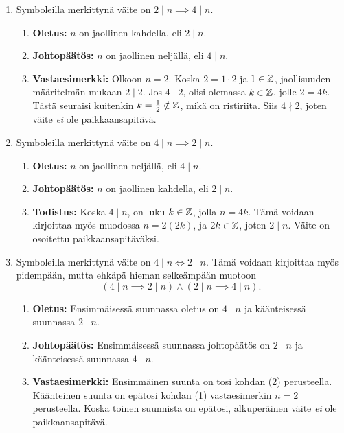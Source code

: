 \documentclass[11pt,a4paper]{amsart}
\begin{document}
\begin{solution}
  \leavevmode\par
  \begin{enumerate}[label=(\arabic*), nosep]
    \item Symboleilla merkittynä väite on \(2 \mid n \implies 4 \mid n\).
    \begin{enumerate}[label=\alph*), nosep]
      \item \textbf{Oletus:} \(n\) on jaollinen kahdella, eli \(2 \mid n\).
      \item \textbf{Johtopäätös:} \(n\) on jaollinen neljällä, eli \(4 \mid n\).
      \item \textbf{Vastaesimerkki:} Olkoon \(n = 2\). Koska \(2 = 1\cdot 2\) ja
        \(1 \in \mathbb{Z}\), jaollisuuden määritelmän mukaan
        \(2 \mid 2\). Jos \(4 \mid 2\), olisi olemassa
        \(k \in \mathbb{Z}\), jolle \(2 = 4k\). Tästä seuraisi kuitenkin
        \(k = \frac{1}{2} \notin \mathbb{Z}\), mikä on ristiriita. Siis \(4 \nmid 2\),
        joten väite \emph{ei} ole paikkaansapitävä.
    \end{enumerate}
  \item Symboleilla merkittynä väite on \(4 \mid n \implies 2 \mid n\).
  \begin{enumerate}[label=\alph*), nosep]
    \item \textbf{Oletus:} \(n\) on jaollinen neljällä, eli \(4 \mid n\).
    \item \textbf{Johtopäätös:} \(n\) on jaollinen kahdella, eli \(2 \mid n\).
    \item \textbf{Todistus:} Koska \(4 \mid n\), on luku \(k \in \mathbb{Z}\), jolla
      \(n = 4k\). Tämä voidaan kirjoittaa myös muodossa \(n = 2(2k)\),
      ja \(2k \in \mathbb{Z}\), joten \(2 \mid n\). Väite on osoitettu
      paikkaansapitäväksi.
  \end{enumerate}
\item Symboleilla merkittynä väite on \(4 \mid n \iff 2 \mid n\).
  Tämä voidaan kirjoittaa myös pidempään, mutta ehkäpä hieman selkeämpään
  muotoon \[(4 \mid n \implies 2 \mid n) \wedge (2 \mid n \implies 4 \mid n).\]
\begin{enumerate}[label=\alph*), nosep]
  \item \textbf{Oletus:} Ensimmäisessä suunnassa oletus on \(4 \mid n\) ja
    käänteisessä suunnassa \(2 \mid n\).
  \item \textbf{Johtopäätös:} Ensimmäisessä suunnassa johtopäätös on
    \(2 \mid n\) ja käänteisessä suunnassa \(4 \mid n\).
  \item \textbf{Vastaesimerkki:} Ensimmäinen suunta on tosi kohdan
    (2) perusteella. Käänteinen suunta on epätosi kohdan (1) vastaesimerkin
    \(n = 2\) perusteella. Koska toinen suunnista on epätosi, alkuperäinen
    väite \emph{ei} ole paikkaansapitävä.
\end{enumerate}
\end{enumerate}
\end{solution}
\end{document}
